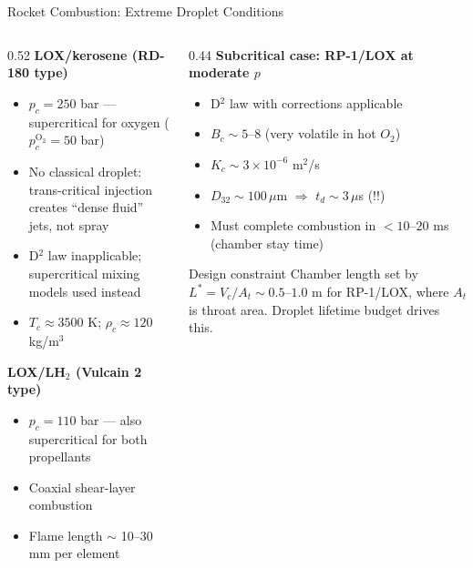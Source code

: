 \documentclass[12pt,aspectratio=169]{beamer}
\newcommand{\Bc}{B_c}
\newcommand{\Kc}{K_c}
\newcommand{\td}{t_d}
\begin{document}
\begin{frame}{Rocket Combustion: Extreme Droplet Conditions}

  \begin{columns}[t]
    \begin{column}{0.52\textwidth}
      \textbf{LOX/kerosene (RD-180 type)}
      \begin{itemize}
        \item $p_c = 250$ bar --- supercritical for oxygen
              ($p_c^{\text{O}_2} = 50$ bar)
        \item No classical droplet: trans-critical injection
              creates ``dense fluid'' jets, not spray
        \item D$^2$ law inapplicable; supercritical mixing models
              used instead
        \item $T_c \approx 3500$ K; $\rho_c \approx 120$ kg/m$^3$
      \end{itemize}

      \vspace{4pt}
      \textbf{LOX/LH$_2$ (Vulcain 2 type)}
      \begin{itemize}
        \item $p_c = 110$ bar --- also supercritical for both
              propellants
        \item Coaxial shear-layer combustion
        \item Flame length $\sim$ 10--30 mm per element
      \end{itemize}
    \end{column}
    \begin{column}{0.44\textwidth}
      \textbf{Subcritical case: RP-1/LOX at moderate $p$}
      \begin{itemize}
        \item D$^2$ law with corrections applicable
        \item $\Bc \sim 5$--$8$ (very volatile in hot $O_2$)
        \item $\Kc \sim 3\times10^{-6}$ m$^2$/s
        \item $D_{32} \sim 100\,\mu$m $\Rightarrow$
              $\td \sim 3\,\mu$s (!!)
        \item Must complete combustion in $< 10$--$20$ ms
              (chamber stay time)
      \end{itemize}

      \begin{exampleblock}{Design constraint}
        Chamber length set by
        $L^* = V_c / A_t \sim 0.5$--$1.0$ m for RP-1/LOX,
        where $A_t$ is throat area.
        Droplet lifetime budget drives this.
      \end{exampleblock}
    \end{column}
  \end{columns}
\end{frame}
\end{document}
